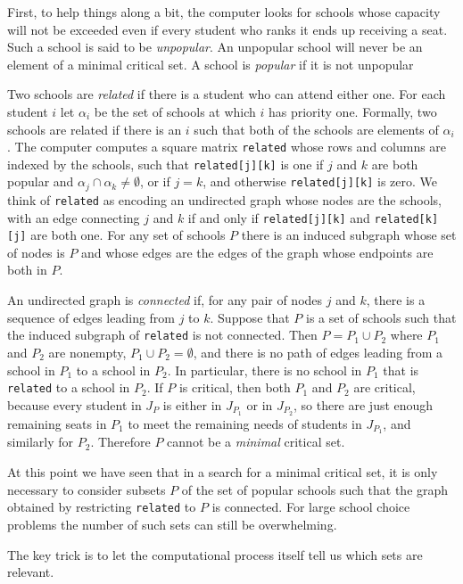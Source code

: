 \documentclass[12pt]{article}
\theoremstyle{definition}
\begin{document}
First, to help things along a bit, the computer looks for schools
whose capacity will not be exceeded even if every student who ranks it
ends up receiving a seat.  Such a school is said to be
\emph{unpopular}.  An unpopular school will never be an element of a
minimal critical set. A school is \emph{popular} if it is not
unpopular

Two schools are \emph{related} if there is a student who can attend
either one.  For each student $i$ let $\alpha_i$ be the set of schools
at which $i$ has priority one.  Formally, two schools are related if
there is an $i$ such that both of the schools are elements of
$\alpha_i$.  The computer computes a square matrix \texttt{related}
whose rows and columns are indexed by the schools, such that
\texttt{related[j][k]} is one if $j$ and $k$ are both popular and
$\alpha_j \cap \alpha_k \ne \emptyset$, or if $j = k$, and otherwise
\texttt{related[j][k]} is zero.  We think of \texttt{related} as
encoding an undirected graph whose nodes are the schools, with an edge
connecting $j$ and $k$ if and only if \texttt{related[j][k]} and
\texttt{related[k][j]} are both one.  For any set of schools $P$ there
is an induced subgraph whose set of nodes is $P$ and whose edges are
the edges of the graph whose endpoints are both in $P$.

An undirected graph is \emph{connected} if, for any pair of nodes $j$
and $k$, there is a sequence of edges leading from $j$ to $k$.
Suppose that $P$ is a set of schools such that the induced subgraph of
\texttt{related} is not connected.  Then $P = P_1 \cup P_2$ where
$P_1$ and $P_2$ are nonempty, $P_1 \cup P_2 = \emptyset$, and there is
no path of edges leading from a school in $P_1$ to a school in $P_2$.
In particular, there is no school in $P_1$ that is \texttt{related} to
a school in $P_2$.  If $P$ is critical, then both $P_1$ and $P_2$ are
critical, because every student in $J_P$ is either in $J_{P_1}$ or in
$J_{P_2}$, so there are just enough remaining seats in $P_1$ to meet
the remaining needs of students in $J_{P_1}$, and similarly for $P_2$.
Therefore $P$ cannot be a \emph{minimal} critical set.

At this point we have seen that in a search for a minimal critical
set, it is only necessary to consider subsets $P$ of the set of
popular schools such that the graph obtained by restricting
\texttt{related} to $P$ is connected.  For large school choice
problems the number of such sets can still be overwhelming.

The key trick is to let the computational process itself tell us which
sets are relevant.  
\end{document}
